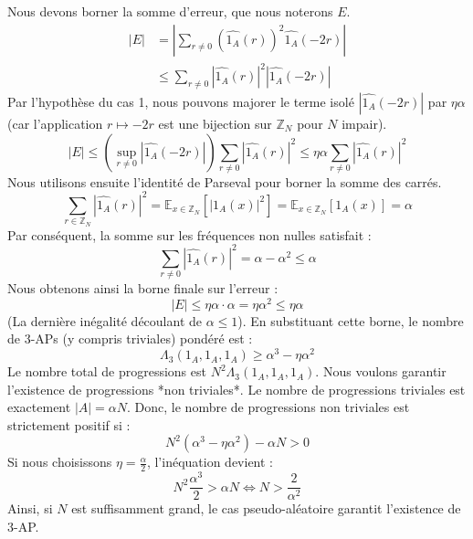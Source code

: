 \documentclass[12pt, a4paper]{article}
\begin{document}
Nous devons borner la somme d'erreur, que nous noterons $E$.
\begin{align}
|E| &= \left| \sum_{r \neq 0} (\widehat{1_A}(r))^2 \widehat{1_A}(-2r) \right| \\
&\leq \sum_{r \neq 0} |\widehat{1_A}(r)|^2 |\widehat{1_A}(-2r)|
\end{align}
Par l'hypothèse du cas 1, nous pouvons majorer le terme isolé $|\widehat{1_A}(-2r)|$ par $\eta \alpha$ (car l'application $r \mapsto -2r$ est une bijection sur $\mathbb{Z}_N$ pour $N$ impair).
\begin{equation}
|E| \leq \left( \sup_{r \neq 0} |\widehat{1_A}(-2r)| \right) \sum_{r \neq 0} |\widehat{1_A}(r)|^2 \leq \eta \alpha \sum_{r \neq 0} |\widehat{1_A}(r)|^2
\end{equation}
Nous utilisons ensuite l'identité de Parseval pour borner la somme des carrés.
\begin{equation}
\sum_{r \in \mathbb{Z}_N} |\widehat{1_A}(r)|^2 = \mathbb{E}_{x \in \mathbb{Z}_N}[|1_A(x)|^2] = \mathbb{E}_{x \in \mathbb{Z}_N}[1_A(x)] = \alpha
\end{equation}
Par conséquent, la somme sur les fréquences non nulles satisfait :
\begin{equation}
\sum_{r \neq 0} |\widehat{1_A}(r)|^2 = \alpha - \alpha^2 \leq \alpha
\end{equation}
Nous obtenons ainsi la borne finale sur l'erreur :
\begin{equation}
|E| \leq \eta \alpha \cdot \alpha = \eta \alpha^2 \leq \eta \alpha
\end{equation}
(La dernière inégalité découlant de $\alpha \leq 1$).
En substituant cette borne, le nombre de 3-APs (y compris triviales) pondéré est :
\begin{equation}
\Lambda_3(1_A, 1_A, 1_A) \geq \alpha^3 - \eta \alpha^2
\end{equation}
Le nombre total de progressions est $N^2 \Lambda_3(1_A, 1_A, 1_A)$. Nous voulons garantir l'existence de progressions *non triviales*. Le nombre de progressions triviales est exactement $|A| = \alpha N$.
Donc, le nombre de progressions non triviales est strictement positif si :
\begin{equation}
N^2 (\alpha^3 - \eta \alpha^2) - \alpha N > 0
\end{equation}
Si nous choisissons $\eta = \frac{\alpha}{2}$, l'inéquation devient :
\begin{equation}
N^2 \frac{\alpha^3}{2} > \alpha N \iff N > \frac{2}{\alpha^2}
\end{equation}
Ainsi, si $N$ est suffisamment grand, le cas pseudo-aléatoire garantit l'existence de 3-AP.
\end{document}
